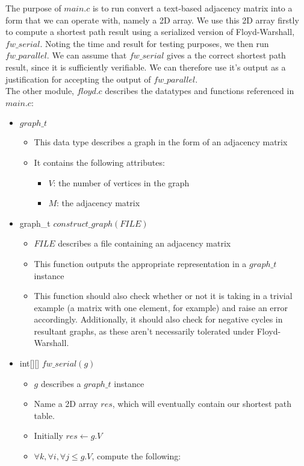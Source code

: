 \documentclass[]{article}
\begin{document}
The purpose of $main.c$ is to run convert a text-based adjacency matrix into a form that we can operate with, namely a 2D array. We use this 2D array firstly to compute a shortest path result using a serialized version of Floyd-Warshall, $fw\_serial$. Noting the time and result for testing purposes, we then run $fw\_parallel$. We can assume that $fw\_serial$ gives a the correct shortest path result, since it is sufficiently verifiable. We can therefore use it's output as a justification for accepting the output of $fw\_parallel$.
\\
The other module, $floyd.c$ describes the datatypes and functions referenced in $main.c$:
\begin{itemize}
	\item $graph\_t$
	\begin{itemize}
		\item This data type describes a graph in the form of an adjacency matrix
		\item It contains the following attributes:
		\begin{itemize}
			\item $V$: the number of vertices in the graph
			\item $M$: the adjacency matrix
		\end{itemize}
	\end{itemize}
	\item graph\_t  $construct\_graph(FILE)$
	\begin{itemize}
		\item $FILE$ describes a file containing an adjacency matrix
		\item This function outputs the appropriate representation in a $graph\_t$ instance
		\item This function should also check whether or not it is taking in a trivial example (a matrix with one element, for example) and raise an error accordingly. Additionally, it should also check for negative cycles in resultant graphs, as these aren't necessarily tolerated under Floyd-Warshall.
	\end{itemize}
	\item int[][] $fw\_serial(g)$
	\begin{itemize}
		\item $g$ describes a $graph\_t$ instance
		\item Name a 2D array $res$, which will  eventually contain our shortest path table.
		\item Initially $res \leftarrow g.V$
		\item $\forall k, \forall i, \forall j \leq g.V$, compute the following:

\end{itemize}
\end{itemize}
\end{document}
